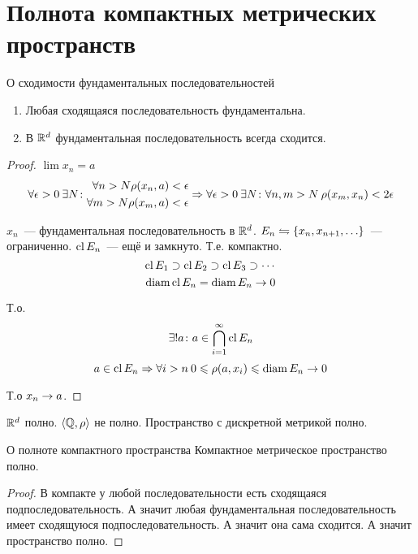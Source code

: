 ﻿\section{Полнота компактных метрических пространств}

\begin{theorem}{О сходимости фундаментальных последовательностей}
\begin{enumerate}
\item Любая сходящаяся последовательность фундаментальна.
\item В $\mathbb{R}^d$ фундаментальная последовательность всегда сходится.
\end{enumerate}
\end{theorem}
\begin{proof}
$\lim x_n = a$
$$\forall \epsilon > 0\: \exists N\colon \begin{aligned}\forall n>N \rho(x_n, a) &< \epsilon \\ \forall m>N \rho(x_m, a) &< \epsilon\end{aligned} \Rightarrow \forall \epsilon>0\: \exists N\colon \forall n,m>N\: \rho(x_m, x_n) < 2\epsilon$$

$x_n$~--- фундаментальная последовательность в $\mathbb{R}^d$. $E_n \leftrightharpoons \{x_n, x_{n+1}, \ldots\}$~--- ограниченно.
$\operatorname{cl} E_n$~--- ещё и замкнуто. Т.е. компактно.
$$\operatorname{cl} E_1 \supset \operatorname{cl} E_2 \supset \operatorname{cl} E_3 \supset \cdots$$
$$\operatorname{diam} \operatorname{cl} E_n = \operatorname{diam} E_n \rightarrow 0$$

Т.о.
$$\exists! a\colon a \in \bigcap_{i=1}^{\infty} \operatorname{cl} E_n$$
$$a \in \operatorname{cl} E_n \Rightarrow \forall i>n\:0\leqslant\rho(a, x_i) \leqslant \operatorname{diam} E_n \rightarrow 0$$

Т.о $x_n \rightarrow a$.
\end{proof}
                                                
\begin{Rem}
$\mathbb{R}^d$ полно. $\left<\mathbb{Q}, \rho\right>$ не полно. Пространство с дискретной метрикой полно.
\end{Rem}

\begin{theorem}{О полноте компактного пространства}
Компактное метрическое пространство полно.
\end{theorem}
\begin{proof}
В компакте у любой последовательности есть сходящаяся подпоследовательность. А значит любая фундаментальная последовательность имеет сходящуюся подпоследовательность.
А значит она сама сходится. А значит пространство полно.
\end{proof}